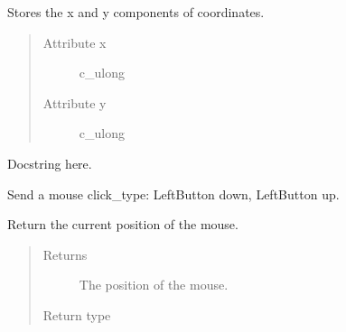 \documentclass[letterpaper,10pt,english]{sphinxmanual}
\begin{document}

\begin{fulllineitems}
\label{macro:macro.MacroPoint}
Stores the x and y components of coordinates.
\begin{quote}\begin{description}
\item[{Attribute x}] \leavevmode
c\_ulong

\item[{Attribute y}] \leavevmode
c\_ulong

\end{description}\end{quote}

\end{fulllineitems}


\begin{fulllineitems}
\label{macro:macro.MouseInput}
Docstring here.

\end{fulllineitems}


\begin{fulllineitems}
\label{macro:macro.click}
Send a mouse click\_type: LeftButton down, LeftButton up.

\end{fulllineitems}


\begin{fulllineitems}
\label{macro:macro.get_mouse_position}
Return the current position of the mouse.
\begin{quote}\begin{description}
\item[{Returns}] \leavevmode
The position of the mouse.

\item[{Return type}] \leavevmode
{\hyperref[macro:macro.MacroPoint]{}}

\end{description}\end{quote}

\end{fulllineitems}
\end{document}
